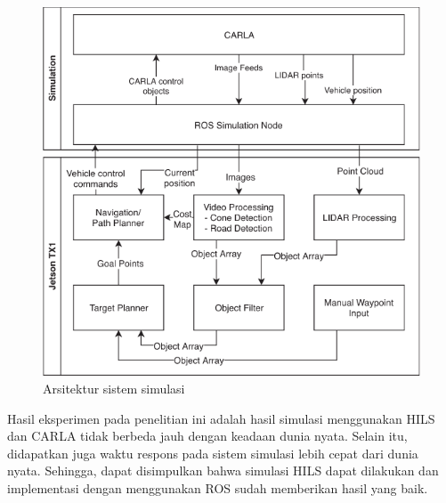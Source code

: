 \begin{figure}[!htbp]
	\centering
	\includegraphics[width=1.0\textwidth]{resources/chapter-2/carla-jetson-arch.png}
	\caption{Arsitektur sistem simulasi \parencite{brogle_CarlaHILS}}
	\label{chapter-2-carla-jetson-arch}
\end{figure}

Hasil eksperimen pada penelitian ini adalah hasil simulasi menggunakan HILS dan
CARLA tidak berbeda jauh dengan keadaan dunia nyata. Selain itu, didapatkan juga
waktu respons pada sistem simulasi lebih cepat dari dunia nyata. Sehingga, dapat
disimpulkan bahwa simulasi HILS dapat dilakukan dan implementasi dengan
menggunakan ROS sudah memberikan hasil yang baik.
